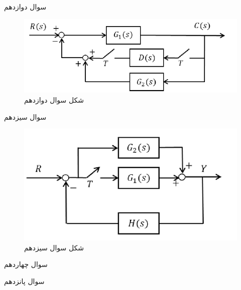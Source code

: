 \documentclass{article}
\begin{document}
\begin{problem}{سوال دوازدهم}



\end{problem}
\begin{figure}
	\includegraphics[width=\linewidth]{Second Series/6.png}
	\caption{شکل سوال دوازدهم}
\end{figure}


\begin{problem}{سوال سیزدهم}
	
	
	
	
	
\end{problem}
\begin{figure}
	\includegraphics[width=\linewidth]{Second Series/7.png}
	\caption{شکل سوال سیزدهم}
\end{figure}

\begin{problem}{سوال چهاردهم}
	
	
	
	
	
\end{problem}


\begin{problem}{سوال پانزدهم}
	
	
	
	
	
\end{problem}
\end{document}
